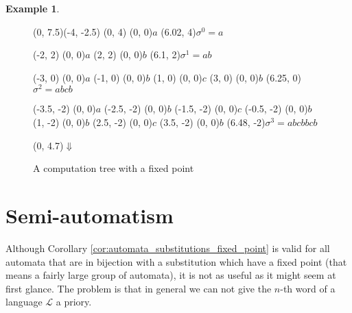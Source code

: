 \documentclass{article}
\theoremstyle{definition}
\newtheorem{example}[theorem]{Example}
\begin{document}
\begin{example}
\begin{figure}[H]
\begin{graph}(0, 7.5)(-4, -2.5)
  (0, 4) (0, 0){$a$} %
  \freetext(6.02, 4){$\sigma^0 = a$}

  (-2, 2)  (0, 0){$a$} %
  (2, 2)  (0, 0){$b$}
  \freetext(6.1, 2){$\sigma^1 = ab$}

  (-3, 0)  (0, 0){$a$} %
  (-1, 0)  (0, 0){$b$}
  (1, 0)  (0, 0){$c$}
  (3, 0)  (0, 0){$b$}
  \freetext(6.25, 0){$\sigma^2 = abcb$}

  (-3.5, -2)  (0, 0){$a$} %
  (-2.5, -2)  (0, 0){$b$}
  (-1.5, -2) (0, 0){$c$}
  (-0.5, -2)  (0, 0){$b$}
  (1, -2)  (0, 0){$b$}
  (2.5, -2)  (0, 0){$c$}
  (3.5, -2)  (0, 0){$b$}
  \freetext(6.48, -2){$\sigma^3 = abcbbcb$}

   
   
  
   
   
   
   

   
   
   
   
   
   
   

  \freetext(0, 4.7){$\Downarrow$}
\end{graph}
\caption{A computation tree with a fixed point}
\label{fig:automata_tree_fixpoint_substitutions}
\end{figure}
\end{example}

\section{Semi-automatism}
Although Corollary \ref{cor:automata_substitutions_fixed_point} is valid for 
all automata that are in bijection with a substitution which have a fixed point
(that means a fairly large group of automata), it is not as useful as it might 
seem at first glance. The problem is that in general we can not give the $n$-th
word of a language $\mathcal{L}$ a priory.
\end{document}
